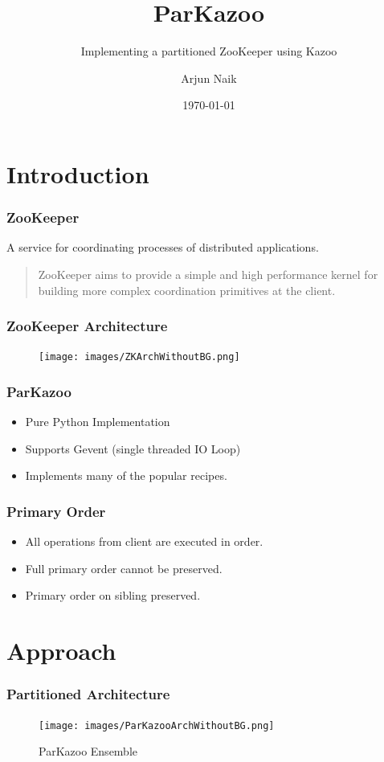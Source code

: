 \documentclass[10pt, compress]{beamer}
\title{ParKazoo}
\subtitle{Implementing a partitioned ZooKeeper using Kazoo}
\date{\today}
\author{Arjun Naik}
\institute{TU Dresden}
\begin{document}
\maketitle

\section{Introduction}

\begin{frame}[fragile]
    \frametitle{ZooKeeper}
    A service for coordinating processes of distributed applications.
    \begin{quote}
        ZooKeeper aims to provide a simple and high performance kernel for building more complex
        coordination primitives at the client. 
    \end{quote}
\end{frame}

\begin{frame}[fragile]
    \frametitle{ZooKeeper Architecture}
    \begin{figure}[ht!]
        \centering
        \texttt{[image: images/ZKArchWithoutBG.png]}
    \end{figure}
\end{frame}

\begin{frame}[fragile]
    \frametitle{ParKazoo}
    \begin{itemize}
        \item Pure Python Implementation
        \item Supports Gevent (single threaded IO Loop)
        \item Implements many of the popular recipes.
    \end{itemize}
\end{frame}

\begin{frame}[fragile]
    \frametitle{Primary Order}
    \begin{itemize}
        \item All operations from client are executed in order.
        \item Full primary order cannot be preserved.
        \item Primary order on sibling preserved.
    \end{itemize}
\end{frame}

\section{Approach}
\begin{frame}[fragile]
    \frametitle{Partitioned Architecture}
    \begin{figure}[ht!]
        \centering
        \texttt{[image: images/ParKazooArchWithoutBG.png]}
        \caption{ParKazoo Ensemble \label{overflow}}
    \end{figure}
\end{frame}
\end{document}
